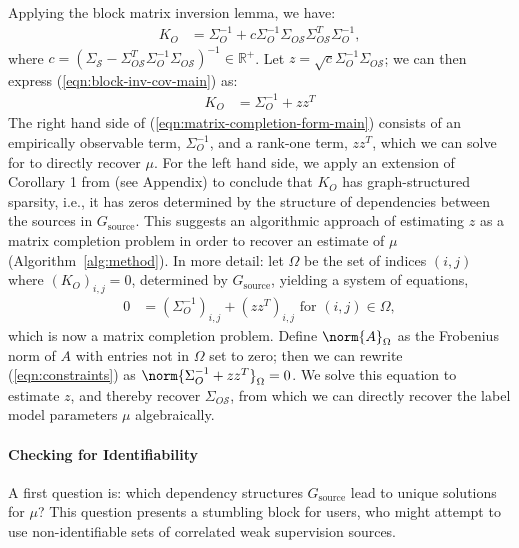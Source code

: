 \documentclass[letterpaper]{article}
\begin{document}
Applying the block matrix inversion lemma, we have:
\begin{align}
	\label{eqn:block-inv-cov-main}
	K_O
	&=
	\Sigma_O^{-1}
	+ c\Sigma_O^{-1}\Sigma_{O\mathcal{S}} \Sigma_{O\mathcal{S}}^T\Sigma_O^{-1},
\end{align}
where $c = \left( \Sigma_\mathcal{S} - \Sigma_{O\mathcal{S}}^T\Sigma_O^{-1}\Sigma_{O\mathcal{S}} \right)^{-1} \in \mathbb{R}^+$.
Let $z = \sqrt{c} \Sigma_O^{-1}\Sigma_{O\mathcal{S}}$; we can then express (\ref{eqn:block-inv-cov-main}) as:
\begin{align}
	\label{eqn:matrix-completion-form-main}
	K_O
	&=
	\Sigma_O^{-1} + zz^T
\end{align}
The right hand side of (\ref{eqn:matrix-completion-form-main}) consists of an empirically observable term, $\Sigma_O^{-1}$, and a rank-one term, $zz^T$, which we can solve for to directly recover $\mu$.
For the left hand side, we apply an extension of Corollary 1 from \citep{loh2012structure} (see Appendix\versionswitch{}{ \ref{appendix:model-estimation}}) to conclude that $K_O$ has graph-structured sparsity, i.e., it has zeros determined by the structure of dependencies between the sources in $G_{\text{source}}$.
This suggests an algorithmic approach of estimating $z$ as a matrix completion problem in order to recover an estimate of $\mu$ (Algorithm~\ref{alg:method}).
In more detail: let $\Omega$ be the set of indices $(i,j)$ where $(K_O)_{i,j} = 0$, determined by $G_{\text{source}}$, yielding a system of equations,
\begin{align}
	0
	&=
	(\Sigma_O^{-1})_{i,j}
	+ \left( zz^T \right)_{i,j} \text{ for } (i,j) \in \Omega,
	\label{eqn:constraints}
\end{align}
which is now a matrix completion problem.
Define $\norm{A}_{\Omega}$ as the Frobenius norm of $A$ with entries not in $\Omega$ set to zero; then we can rewrite (\ref{eqn:constraints}) as $\norm{ \Sigma_O^{-1} + zz^T }_\Omega = 0$.
We solve this equation to estimate $z$, and thereby recover $\Sigma_{O\mathcal{S}}$, from which we can directly recover the label model parameters $\mu$ algebraically.

\paragraph*{Checking for Identifiability}
A first question is: which dependency structures $G_{\text{source}}$ lead to unique solutions for $\mu$?
This question presents a stumbling block for users, who might attempt to use non-identifiable sets of correlated weak supervision sources.
\end{document}
